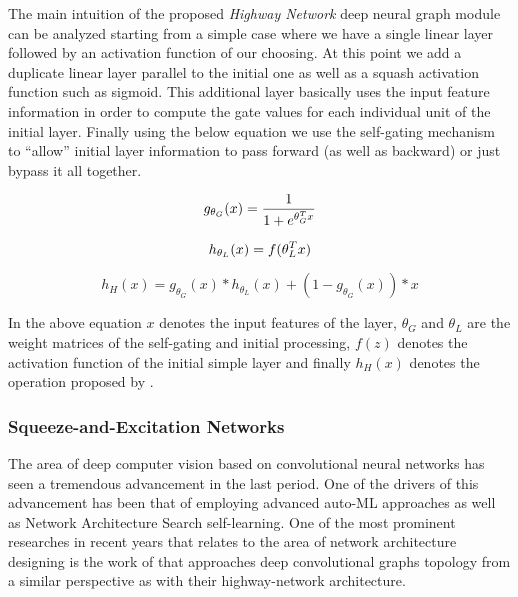 \documentclass[conference]{IEEEtran}
\begin{document}
The main intuition of the proposed \textit{Highway Network} deep neural graph module can be analyzed starting from a simple case where we have a single linear layer followed by an activation function of our choosing. At this point we add a duplicate linear layer parallel to the initial one as well as a squash activation function such as sigmoid. This additional layer basically uses the input feature information in order to compute the gate values for each individual unit of the initial layer. Finally using the below equation we use the self-gating mechanism to “allow” initial layer information to pass forward (as well as backward) or just bypass it all together.

\begin{equation}
  g_{\theta_G}(x) = \frac{1}{1+e^{\theta_G^Tx}} \\
\end{equation}

\begin{equation}
  h_{\theta_{L}}(x) =  f(\theta_{L}^Tx) \\
\end{equation}

\begin{equation}
      h_{H}(x) = g_{\theta_G}(x) * h_{\theta_{L}}(x) + (1 - g_{\theta_G}(x)) * x
\end{equation}

In the above equation $x$ denotes the input features of the layer, $\theta_G$ and $\theta_L$ are the weight matrices of the self-gating and initial processing, $f(z)$ denotes the activation function of the initial simple layer and finally $h_{H}(x)$ denotes the operation proposed by \cite{srivastava2015highway}.\\



\subsubsection{Squeeze-and-Excitation Networks}
\label{summary:squeeze}

The area of deep computer vision based on convolutional neural networks has seen a tremendous advancement in the last period. One of the drivers of this advancement has been that of employing advanced auto-ML approaches as well as Network Architecture Search self-learning. One of the most prominent researches in recent years that relates to the area of network architecture designing is the work of \cite{hu2019squeezeandexcitation} that approaches deep convolutional graphs topology from a similar perspective as \cite{srivastava2015highway} with their highway-network architecture. 
\end{document}

